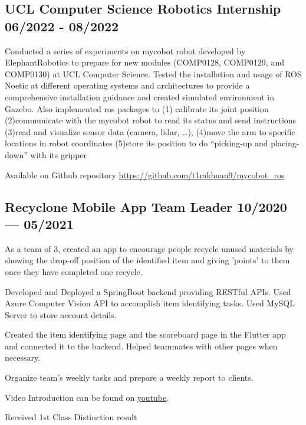 \subsection*{{
    UCL Computer Science Robotics Internship
    \hfill 06/2022 - 08/2022
}}
\begin{zitemize}
    \item   Conducted a series of experiments on mycobot robot developed by ElephantRobotics 
            to prepare for new modules (COMP0128, COMP0129, and COMP0130) at UCL Computer Science. 
            Tested the installation and usage of ROS Noetic at different operating systems and architectures to provide a comprehensive installation guidance and 
            created simulated environment in Gazebo. 
            Also implemented ros packages to (1) calibrate its joint position
            (2)communicate with the mycobot robot to read its status and send instructions
            (3)read and visualize sensor data (camera, lidar, …),
            (4)move the arm to specific locations in robot coordinates
            (5)store its position to do “picking-up and placing-down” with its gripper 
    \item   Available on Github repository 
            \url{https://github.com/t1mkhuan9/mycobot_ros}
\end{zitemize}


\subsection{{
    Recyclone Mobile App Team Leader
    \hfill 10/2020 --- 05/2021
}}
\begin{zitemize}
    \item   As a team of 3, created an app to encourage people recycle unused materials by showing
            the drop-off position of the identified item and giving 'points' to them
            once they have completed one recycle. 
    \item   Developed and Deployed a SpringBoot backend providing RESTful APIs.
            Used Azure Computer Vision API to accomplish item identifying tasks.
            Used MySQL Server to store account details. 
    \item   Created the item identifying page and the scoreboard page in the Flutter app and connected it
            to the backend. Helped teammates with other pages when necessary. 
    \item   Organize team's weekly tasks and prepare a weekly report to clients. 
    \item   Video Introduction can be found on \href{https://www.youtube.com/watch?v=gh0Uv4mf7cA&t=3s&ab_channel=timkhuang}{youtube}.
    \item   Received 1st Class Distinction result
\end{zitemize}



